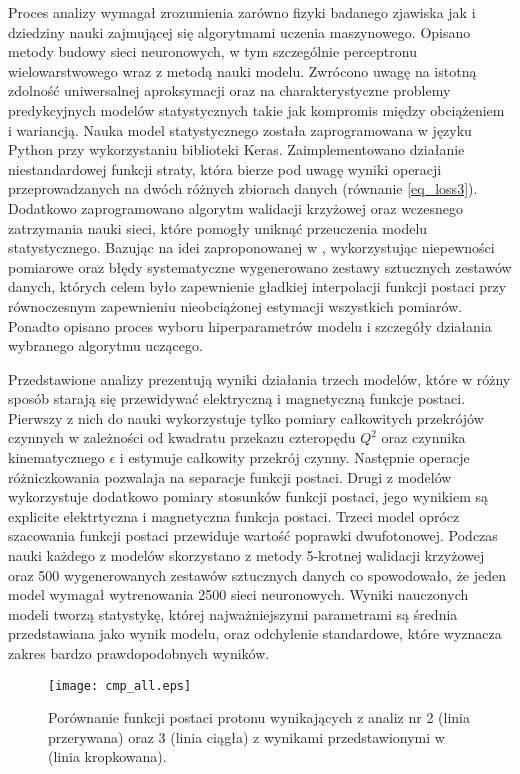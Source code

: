 \documentclass[11pt]{book}
\theoremstyle{definition}
\begin{document}
Proces analizy wymagał zrozumienia zarówno fizyki badanego zjawiska jak i dziedziny nauki zajmującej się algorytmami uczenia maszynowego. Opisano metody budowy sieci neuronowych, w tym szczególnie perceptronu wielowarstwowego wraz z metodą nauki modelu. Zwrócono uwagę na istotną zdolność uniwersalnej aproksymacji oraz na charakterystyczne problemy predykcyjnych modelów statystycznych takie jak kompromis między obciążeniem i wariancją. Nauka model statystycznego została zaprogramowana w języku Python przy wykorzystaniu biblioteki Keras. Zaimplementowano działanie niestandardowej funkcji straty, która bierze pod uwagę wyniki operacji przeprowadzanych na dwóch różnych zbiorach danych (równanie \ref{eq_loss3}). Dodatkowo zaprogramowano algorytm walidacji krzyżowej oraz wczesnego zatrzymania nauki sieci, które pomogły uniknąć przeuczenia modelu statystycznego. Bazując na idei zaproponowanej w \cite{2002JHEP...05..062F}, wykorzystując niepewności pomiarowe oraz błędy systematyczne wygenerowano zestawy sztucznych zestawów danych, których celem było zapewnienie gładkiej interpolacji funkcji postaci przy równoczesnym zapewnieniu nieobciążonej estymacji wszystkich pomiarów. Ponadto opisano proces wyboru hiperparametrów modelu i szczegóły działania wybranego algorytmu uczącego.


Przedstawione analizy prezentują wyniki działania trzech modelów, które w różny sposób starają się przewidywać elektryczną i magnetyczną funkcje postaci. Pierwszy z nich do nauki wykorzystuje tylko pomiary całkowitych przekrójów czynnych w zależności od kwadratu przekazu czteropędu $Q^2$ oraz czynnika kinematycznego $\epsilon$ i estymuje całkowity przekrój czynny. Następnie operacje różniczkowania pozwalaja na separacje funkcji postaci. Drugi z modelów wykorzystuje dodatkowo pomiary stosunków funkcji postaci, jego wynikiem są explicite elektrtyczna i magnetyczna funkcja postaci. Trzeci model oprócz szacowania funkcji postaci przewiduje wartość poprawki dwufotonowej. Podczas nauki każdego z modelów skorzystano z metody 5-krotnej walidacji krzyżowej oraz 500 wygenerowanych zestawów sztucznych danych co spowodowało, że jeden model wymagał wytrenowania 2500 sieci neuronowych. Wyniki nauczonych modeli tworzą statystykę, której najważniejszymi parametrami są średnia przedstawiana jako wynik modelu, oraz odchylenie standardowe, które wyznacza zakres bardzo prawdopodobnych wyników.

\begin{figure}[hp!]
	\centering
	\texttt{[image: cmp\_all.eps]}
	\caption{Porównanie funkcji postaci protonu wynikających z analiz nr 2 (linia przerywana) oraz 3 (linia ciągła) z wynikami przedstawionymi w \cite{2009PhRvC..79f5204A} (linia kropkowana).} 
	\label{fig:cmp_all}
\end{figure}
\end{document}
